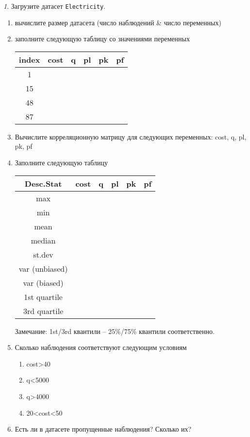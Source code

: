 \documentclass[12pt]{article}
\theoremstyle{remark}
\newtheorem{exercise}{}[section]
\begin{document}
\begin{exercise}
Загрузите датасет \texttt{Electricity}.
\begin{enumerate}
	\item вычислите размер датасета (число наблюдений \& число переменных)
	\item заполните следующую таблицу со значениями переменных
	\begin{center}
		\begin{tabular}{|c|c|c|c|c|c|} \hline
			index & cost & q & pl & pk & pf \\ \hline\hline
			1 & & & & & \\ \hline
			15 & & & &  & \\ \hline
			48 & & & & & \\ \hline
			87 & & & & & \\ \hline
		\end{tabular}
	\end{center}
	\item Вычислите корреляционную матрицу для следующих переменных: cost, q, pl, pk, pf 
	\item Заполните следующую таблицу
	\begin{center}
		\begin{tabular}{|c|c|c|c|c|c|} \hline
			Desc.Stat & cost & q & pl & pk & pf\\ \hline\hline
			max & & & & & \\ \hline
			min & & & & & \\ \hline
			mean & & & &  & \\ \hline
			median & & & & & \\ \hline
			st.dev & & & & & \\ \hline
			var (unbiased) & & & & & \\ \hline
			var (biased) & & & & & \\ \hline
			1st quartile & & & & & \\ \hline
			3rd quartile & & & & & \\ \hline
		\end{tabular}
	\end{center}
	Замечание: 1st/3rd квантили -- 25\%/75\% квантили соответственно.
	\item Сколько наблюдения соответствуют следующим условиям
		\begin{enumerate}
			\item cost>40
			\item q<5000
			\item q>4000
			\item 20<cost<50
		\end{enumerate}
	\item Есть ли в датасете пропущенные наблюдения?
	Сколько их?
\end{enumerate}
\end{exercise}
\end{document}
